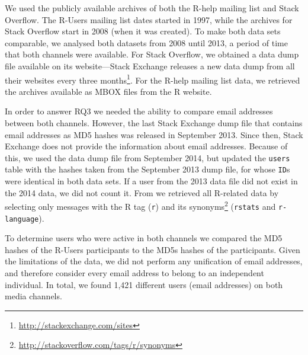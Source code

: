 We used the publicly available archives of both	the R-help mailing list and Stack Overflow. The R-Users mailing list dates started in 1997, while the archives for Stack Overflow start in 2008 (when it was created).
To make both data sets comparable, we analysed both datasets from 2008 until 2013, a period of time that both channels were available.
For Stack Overflow, we obtained a data dump file available on its website---Stack Exchange releases a new data dump from all their websites every three months\footnote{\url{http://stackexchange.com/sites}}. For the R-help mailing list data, we retrieved the archives available as MBOX files from the R website.

    
In order to answer RQ3 we needed the ability to compare email addresses between both channels. However, the last Stack Exchange dump file that contains email addresses as MD5 hashes was released in September 2013.
Since then, Stack Exchange does not provide the information about email addresses.
Because of this, we used the data dump file from September 2014, but updated the \texttt{users} table with the hashes taken from the September 2013 dump file, for whose \texttt{ID}s were identical in both data sets.
If a user from the 2013 data file did not exist in the 2014 data, we did not count it.
From \SO we retrieved all R-related data by selecting only messages with the R tag (\texttt{r}) and its synonyms\footnote{\url{http://stackoverflow.com/tags/r/synonyms}} (\texttt{rstats} and \texttt{r-language}).

To determine users who were active in both channels we compared the MD5 hashes of the R-Users participants to the MD5s hashes of the \SO participants. Given the limitations of the \SO data, we did not perform any unification of email addresses, and therefore consider every email address to belong to an independent individual. In total, we found 1,421 different users (email addresses) on both media channels.


